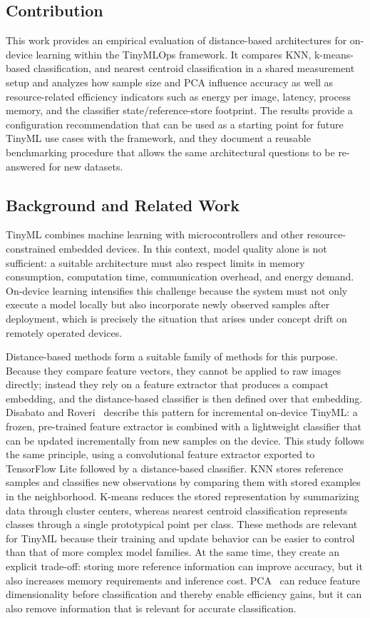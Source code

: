 \documentclass[sigconf,review]{acmart}
\begin{document}
\subsection{Contribution}
This work provides an empirical evaluation of distance-based architectures for on-device learning within the TinyMLOps framework.
It compares KNN, k-means-based classification, and nearest centroid classification in a shared measurement setup and analyzes how sample size and PCA influence accuracy as well as resource-related efficiency indicators such as energy per image, latency, process memory, and the classifier state/reference-store footprint.
The results provide a configuration recommendation that can be used as a starting point for future TinyML use cases with the framework, and they document a reusable benchmarking procedure that allows the same architectural questions to be re-answered for new datasets.

\subsection{Background and Related Work}
TinyML combines machine learning with microcontrollers and other resource-constrained embedded devices.
In this context, model quality alone is not sufficient: a suitable architecture must also respect limits in memory consumption, computation time, communication overhead, and energy demand.
On-device learning intensifies this challenge because the system must not only execute a model locally but also incorporate newly observed samples after deployment, which is precisely the situation that arises under concept drift on remotely operated devices.

Distance-based methods form a suitable family of methods for this purpose.
Because they compare feature vectors, they cannot be applied to raw images directly; instead they rely on a feature extractor that produces a compact embedding, and the distance-based classifier is then defined over that embedding.
Disabato and Roveri~\cite{disabato2020incremental} describe this pattern for incremental on-device TinyML: a frozen, pre-trained feature extractor is combined with a lightweight classifier that can be updated incrementally from new samples on the device.
This study follows the same principle, using a convolutional feature extractor exported to TensorFlow Lite followed by a distance-based classifier.
KNN stores reference samples and classifies new observations by comparing them with stored examples in the neighborhood.
K-means reduces the stored representation by summarizing data through cluster centers, whereas nearest centroid classification represents classes through a single prototypical point per class.
These methods are relevant for TinyML because their training and update behavior can be easier to control than that of more complex model families.
At the same time, they create an explicit trade-off: storing more reference information can improve accuracy, but it also increases memory requirements and inference cost.
PCA~\cite{jolliffe2002pca} can reduce feature dimensionality before classification and thereby enable efficiency gains, but it can also remove information that is relevant for accurate classification.
\end{document}
